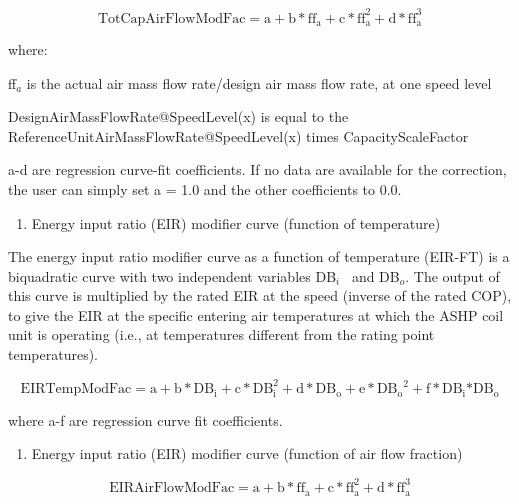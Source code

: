 \begin{equation}
{\mathrm{TotCapAirFlowModFac}} = {\mathrm{a}} + {\mathrm{b*f}}{{\mathrm{f}}_{\mathrm{a}}} + {\mathrm{c*ff}}_{\mathrm{a}}^2 + {\mathrm{d*ff}}_{\mathrm{a}}^3
\end{equation}

where:

ff\(_{a}\) is the actual air mass flow rate/design air mass flow rate, at one speed level

DesignAirMassFlowRate@SpeedLevel(x) is equal to the ReferenceUnitAirMassFlowRate@SpeedLevel(x) times CapacityScaleFactor

a-d are regression curve-fit coefficients.  If no data are available for the correction, the user can simply set a = 1.0 and the other coefficients to 0.0.

\begin{enumerate}
\def\labelenumi{\arabic{enumi})}
\setcounter{enumi}{2}
\tightlist
\item
  Energy input ratio (EIR) modifier curve (function of temperature)
\end{enumerate}

The energy input ratio modifier curve as a function of temperature (EIR-FT) is a biquadratic curve with two independent variables DB\(_{i}\)~ and DB\(_{o}\). The output of this curve is multiplied by the rated EIR at the speed (inverse of the rated COP), to give the EIR at the specific entering air temperatures at which the ASHP coil unit is operating (i.e., at temperatures different from the rating point temperatures).

\begin{equation}
{\mathrm{EIRTempModFac}} = {\mathrm{a}} + {\mathrm{b*D}}{{\mathrm{B}}_{\mathrm{i}}} + {\mathrm{c*DB}}_{\mathrm{i}}^2 + {\mathrm{d*D}}{{\mathrm{B}}_{\mathrm{o}}} + {\mathrm{e*D}}{{\mathrm{B}}_{\mathrm{o}}}^2 + {\mathrm{f*D}}{{\mathrm{B}}_{\mathrm{i}}}{\mathrm{*D}}{{\mathrm{B}}_{\mathrm{o}}}
\end{equation}

where a-f are regression curve fit coefficients.

\begin{enumerate}
\def\labelenumi{\arabic{enumi})}
\setcounter{enumi}{3}
\tightlist
\item
  Energy input ratio (EIR) modifier curve (function of air flow fraction)
\end{enumerate}

\begin{equation}
{\mathrm{EIRAirFlowModFac}} = {\mathrm{a}} + {\mathrm{b*f}}{{\mathrm{f}}_{\mathrm{a}}} + {\mathrm{c*ff}}_{\mathrm{a}}^2 + {\mathrm{d*ff}}_{\mathrm{a}}^3
\end{equation}

